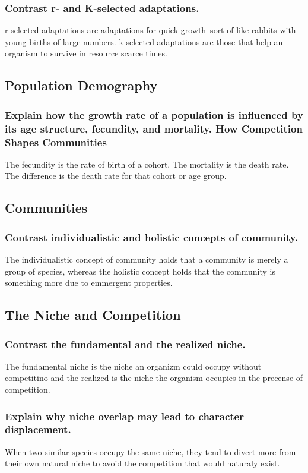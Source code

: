 \documentclass[a4paper]{article}
\begin{document}
\subsubsection{Contrast r- and K-selected adaptations.}
r-selected adaptations are adaptations for quick growth--sort of like rabbits with young births of large numbers. k-selected adaptations
are those that help an organism to survive in resource scarce times. 

\subsection{Population Demography}
\subsubsection{Explain how the growth rate of a population is influenced by its age structure, fecundity, and mortality.
How Competition Shapes Communities}
The fecundity is the rate of birth of a cohort. The mortality is the death rate. The difference is the death rate for that cohort or
age group.

\subsection{Communities}
\subsubsection{Contrast individualistic and holistic concepts of community.}
The individualistic concept of community holds that a community is merely a group of species, whereas the holistic concept holds
that the community is something more due to emmergent properties.

\subsection{The Niche and Competition}
\subsubsection{Contrast the fundamental and the realized niche.}
The fundamental niche is the niche an organizm could occupy without competitino and the realized is the niche the organism
occupies in the precense of competition.

\subsubsection{Explain why niche overlap may lead to character displacement.}
When two similar species occupy the same niche, they tend to divert more from their own natural niche to avoid the competition
that would naturaly exist.
\end{document}

